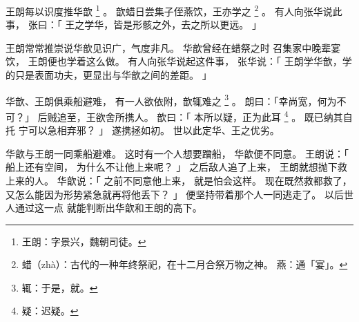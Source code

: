 \begin{paracol}{2}
\switchcolumn*[\section{}]

王朗每以识度推华歆%
\footnote{%
    王朗：字景兴，魏朝司徒。
}%
。
歆蜡日尝集子侄燕饮，王亦学之%
\footnote{%
    蜡（zhà）：古代的一种年终祭祀，在十二月合祭万物之神。
    燕：通「宴」。
}%
。
有人向张华说此事，
张曰：「
    王之学华，皆是形骸之外，去之所以更远。
」

\switchcolumn

王朗常常推崇说华歆见识广，气度非凡。
华歆曾经在蜡祭之时
召集家中晚辈宴饮，
王朗便也学着这么做。
有人向张华说起这件事，
张华说：「
    王朗学华歆，学的只是表面功夫，更显出与华歆之间的差距。
」


\switchcolumn*[\section{}]

华歆、王朗俱乘船避难，
有一人欲依附，歆辄难之%
\footnote{%
    辄：于是，就。
}%
。
朗曰：「幸尚宽，何为不可？」
后贼追至，王欲舍所携人。
歆曰：「
    本所以疑，正为此耳%
    \footnote{%
        疑：迟疑。
    }%
    。
    既已纳其自托
    宁可以急相弃邪？
」
遂携拯如初。
世以此定华、王之优劣。

\switchcolumn

华歆与王朗一同乘船避难。
这时有一个人想要蹭船，
华歆便不同意。
王朗说：「
    船上还有空间，
    为什么不让他上来呢？
」
之后敌人追了上来，
王朗就想抛下救上来的人。
华歆说：「
    之前不同意他上来，
    就是怕会这样。
    现在既然救都救了，
    又怎么能因为形势紧急就再将他丢下？
」
便坚持带着那个人一同逃走了。
以后世人通过这一点
就能判断出华歆和王朗的高下。

\end{paracol}

